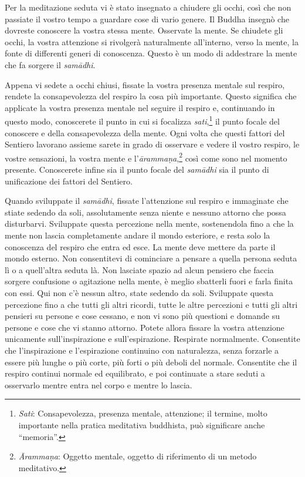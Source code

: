 Per la meditazione seduta vi è stato insegnato a chiudere gli occhi,
così che non passiate il vostro tempo a guardare cose di vario genere.
Il Buddha insegnò che dovreste conoscere la vostra stessa mente.
Osservate la mente. Se chiudete gli occhi, la vostra attenzione si
rivolgerà naturalmente all'interno, verso la mente, la fonte di
differenti generi di conoscenza. Questo è un modo di addestrare la mente
che fa sorgere il \emph{samādhi}.

Appena vi sedete a occhi chiusi, fissate la vostra presenza mentale sul
respiro, rendete la consapevolezza del respiro la cosa più importante.
Questo significa che applicate la vostra presenza mentale nel seguire il
respiro e, continuando in questo modo, conoscerete il punto in cui si
focalizza \emph{sati},\footnote{\emph{Sati}: Consapevolezza, presenza
  mentale, attenzione; il termine, molto importante nella pratica
  meditativa buddhista, può significare anche ``memoria''.} il punto
focale del conoscere e della consapevolezza della mente. Ogni volta che
questi fattori del Sentiero lavorano assieme sarete in grado di
osservare e vedere il vostro respiro, le vostre sensazioni, la vostra
mente e l'\emph{ārammaṇa},\footnote{\emph{Ārammaṇa}: Oggetto mentale,
  oggetto di riferimento di un metodo meditativo.} così come sono nel
momento presente. Conoscerete infine sia il punto focale del
\emph{samādhi} sia il punto di unificazione dei fattori del Sentiero.

Quando sviluppate il \emph{samādhi}, fissate l'attenzione sul respiro e
immaginate che stiate sedendo da soli, assolutamente senza niente e
nessuno attorno che possa disturbarvi. Sviluppate questa percezione
nella mente, sostenendola fino a che la mente non lascia completamente
andare il mondo esteriore, e resta solo la conoscenza del respiro che
entra ed esce. La mente deve mettere da parte il mondo esterno. Non
consentitevi di cominciare a pensare a quella persona seduta lì o a
quell'altra seduta là. Non lasciate spazio ad alcun pensiero che faccia
sorgere confusione o agitazione nella mente, è meglio sbatterli fuori e
farla finita con essi. Qui non c'è nessun altro, state sedendo da soli.
Sviluppate questa percezione fino a che tutti gli altri ricordi, tutte
le altre percezioni e tutti gli altri pensieri su persone e cose
cessano, e non vi sono più questioni e domande su persone e cose che vi
stanno attorno. Potete allora fissare la vostra attenzione unicamente
sull'inspirazione e sull'espirazione. Respirate normalmente. Consentite
che l'inspirazione e l'espirazione continuino con naturalezza, senza
forzarle a essere più lunghe o più corte, più forti o più deboli del
normale. Consentite che il respiro continui normale ed equilibrato, e
poi continuate a stare seduti a osservarlo mentre entra nel corpo e
mentre lo lascia.

